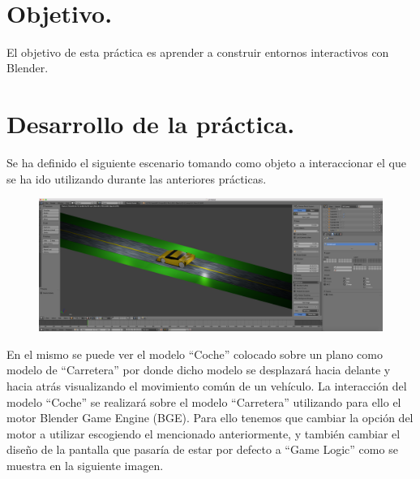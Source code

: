 \documentclass[10pt]{article}
\begin{document}
\begin{center}
 		\\																		%
\vspace{2cm} 																				
\begin{center}																					

 			\end{center}												  						
\end{center}							 											
																					
\newpage																		

\tableofcontents 

\newpage

\section{Objetivo.}
El objetivo de esta práctica es aprender a construir entornos interactivos con Blender.


\section{Desarrollo de la práctica.}
Se ha definido el siguiente escenario tomando como objeto a interaccionar el que se ha ido utilizando durante las anteriores prácticas. \\

\begin{figure}[H]
	\begin{center}
	 		\includegraphics[width = 1.00\textwidth]{Imagenes/p4-img1}
	\end{center} 
\end{figure}

En el mismo se puede ver el modelo ``Coche'' colocado sobre un plano como modelo de ``Carretera'' por donde dicho modelo se desplazará hacia delante y hacia atrás visualizando el movimiento común de un vehículo. La interacción del modelo ``Coche'' se realizará sobre el modelo ``Carretera'' utilizando para ello el motor Blender Game Engine (BGE).  Para ello tenemos que cambiar la opción del motor a utilizar escogiendo el mencionado anteriormente, y también cambiar el diseño de la pantalla que pasaría de estar por defecto a ``Game Logic'' como se muestra en la siguiente imagen. \\
\end{document}
